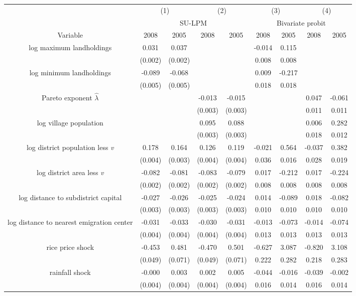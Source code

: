 \begin{table}[!h]
\centering
\begin{tabular}[t]{ccccccccc}
\toprule
\multicolumn{1}{c}{ } & \multicolumn{2}{c}{(1)} & \multicolumn{2}{c}{(2)} & \multicolumn{2}{c}{(3)} & \multicolumn{2}{c}{(4)} \\
\cmidrule(l{3pt}r{3pt}){2-3} \cmidrule(l{3pt}r{3pt}){4-5} \cmidrule(l{3pt}r{3pt}){6-7} \cmidrule(l{3pt}r{3pt}){8-9}
\multicolumn{1}{c}{ } & \multicolumn{4}{c}{SU-LPM} & \multicolumn{4}{c}{Bivariate probit} \\
\cmidrule(l{3pt}r{3pt}){2-5} \cmidrule(l{3pt}r{3pt}){6-9}
Variable & 2008 & 2005 & 2008 & 2005 & 2008 & 2005 & 2008 & 2005\\
\midrule
log maximum landholdings & 0.031 & 0.037 &  &  & -0.014 & 0.115 &  & \\
 & (0.002) & (0.002) &  &  & 0.008 & 0.008 &  & \\
log minimum landholdings & -0.089 & -0.068 &  &  & 0.009 & -0.217 &  & \\
 & (0.005) & (0.005) &  &  & 0.018 & 0.018 &  & \\
Pareto exponent $\widehat{\lambda}$ &  &  & -0.013 & -0.015 &  &  & 0.047 & -0.061\\
\addlinespace
 &  &  & (0.003) & (0.003) &  &  & 0.011 & 0.011\\
log village population &  &  & 0.095 & 0.088 &  &  & 0.006 & 0.282\\
 &  &  & (0.003) & (0.003) &  &  & 0.018 & 0.012\\
log district population less \emph{v} & 0.178 & 0.164 & 0.126 & 0.119 & -0.021 & 0.564 & -0.037 & 0.382\\
 & (0.004) & (0.003) & (0.004) & (0.004) & 0.036 & 0.016 & 0.028 & 0.019\\
\addlinespace
log district area less \emph{v} & -0.082 & -0.081 & -0.083 & -0.079 & 0.017 & -0.212 & 0.017 & -0.224\\
 & (0.002) & (0.002) & (0.002) & (0.002) & 0.008 & 0.008 & 0.008 & 0.008\\
log distance to subdistrict capital & -0.027 & -0.026 & -0.025 & -0.024 & 0.014 & -0.089 & 0.018 & -0.082\\
 & (0.003) & (0.003) & (0.003) & (0.003) & 0.010 & 0.010 & 0.010 & 0.010\\
log distance to nearest emigration center & -0.031 & -0.033 & -0.030 & -0.031 & -0.013 & -0.073 & -0.014 & -0.074\\
\addlinespace
 & (0.004) & (0.004) & (0.004) & (0.004) & 0.013 & 0.013 & 0.013 & 0.013\\
rice price shock & -0.453 & 0.481 & -0.470 & 0.501 & -0.627 & 3.087 & -0.820 & 3.108\\
 & (0.049) & (0.071) & (0.049) & (0.071) & 0.222 & 0.282 & 0.218 & 0.283\\
rainfall shock & -0.000 & 0.003 & 0.002 & 0.005 & -0.044 & -0.016 & -0.039 & -0.002\\
 & (0.004) & (0.004) & (0.004) & (0.004) & 0.016 & 0.014 & 0.016 & 0.014\\
\bottomrule
\end{tabular}
\end{table}
